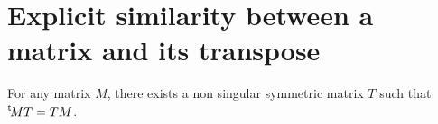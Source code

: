 \documentclass{article}%
\def\transpose#1{{\vphantom{#1}}^{\mathrm{t}}\!#1}
\begin{document}
\section{Explicit similarity between a matrix and its transpose}%
\label{A:T}
% 
\begin{prop}
\label{transpose-symmetric}
For any matrix $M$, 
there exists a non singular symmetric matrix $T$ such that $\transpose{M}T = TM$.
\end{prop}
\end{document}
